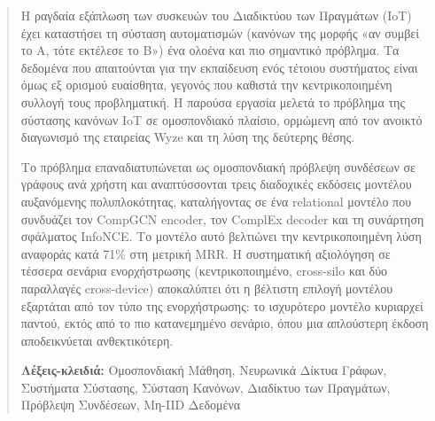 \begin{abstract}
Η ραγδαία εξάπλωση των συσκευών του Διαδικτύου των Πραγμάτων (IoT) έχει καταστήσει τη σύσταση αυτοματισμών (κανόνων της μορφής «αν συμβεί το Α, τότε εκτέλεσε το Β») ένα ολοένα και πιο σημαντικό πρόβλημα. Τα δεδομένα που απαιτούνται για την εκπαίδευση ενός τέτοιου συστήματος είναι όμως εξ ορισμού ευαίσθητα, γεγονός που καθιστά την κεντρικοποιημένη συλλογή τους προβληματική. Η παρούσα εργασία μελετά το πρόβλημα της σύστασης κανόνων IoT σε ομοσπονδιακό πλαίσιο, ορμώμενη από τον ανοικτό διαγωνισμό της εταιρείας Wyze και τη λύση της δεύτερης θέσης.

Το πρόβλημα επαναδιατυπώνεται ως ομοσπονδιακή πρόβλεψη συνδέσεων σε γράφους ανά χρήστη και αναπτύσσονται τρεις διαδοχικές εκδόσεις μοντέλου αυξανόμενης πολυπλοκότητας, καταλήγοντας σε ένα relational μοντέλο που συνδυάζει τον CompGCN encoder, τον ComplEx decoder και τη συνάρτηση σφάλματος InfoNCE. Το μοντέλο αυτό βελτιώνει την κεντρικοποιημένη λύση αναφοράς κατά 71\% στη μετρική MRR. Η συστηματική αξιολόγηση σε τέσσερα σενάρια ενορχήστρωσης (κεντρικοποιημένο, cross-silo και δύο παραλλαγές cross-device) αποκαλύπτει ότι η βέλτιστη επιλογή μοντέλου εξαρτάται από τον τύπο της ενορχήστρωσης: το ισχυρότερο μοντέλο κυριαρχεί παντού, εκτός από το πιο κατανεμημένο σενάριο, όπου μια απλούστερη έκδοση αποδεικνύεται ανθεκτικότερη.

\vspace{1em}
\noindent\textbf{Λέξεις-κλειδιά:} Ομοσπονδιακή Μάθηση, Νευρωνικά Δίκτυα Γράφων, Συστήματα Σύστασης, Σύσταση Κανόνων, Διαδίκτυο των Πραγμάτων, Πρόβλεψη Συνδέσεων, Μη-IID Δεδομένα
\end{abstract}
